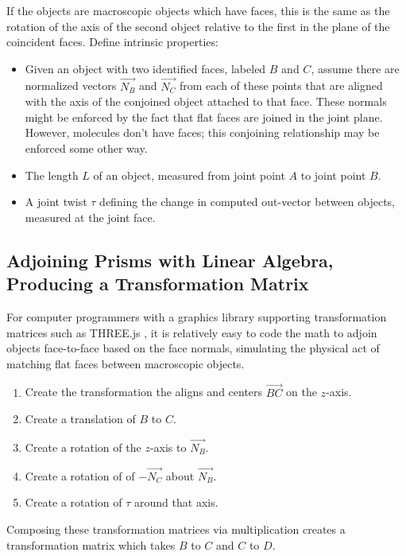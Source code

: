 \documentclass[mathematics,article,submit,pdftex,moreauthors]{Definitions/mdpi}
\begin{document}
If the objects are macroscopic objects which have faces, this is the same as the rotation
of the axis of the second object relative to the first in the plane of the coincident faces.
Define intrinsic properties:

\begin{itemize}
\item Given an object with two identified faces, labeled $B$ and $C$, assume there are normalized
  vectors $\overrightarrow{N_B}$ and $\overrightarrow{N_C}$
  from each of these points that are aligned with the axis of the conjoined object attached to
  that face. These normals might be enforced by the fact that flat faces are joined in the joint plane.
  However, molecules don't have faces; this conjoining relationship may be enforced some other way.
\item The length $L$ of an object, measured from joint point $A$ to joint point $B$.
\item A joint twist $\tau$ defining the change in computed out-vector between objects,
  measured at the joint face.
\end{itemize}

\subsection{Adjoining Prisms with Linear Algebra, Producing a Transformation Matrix}
\label{sec:adjoin}

For computer programmers with a graphics library supporting transformation matrices such
as THREE.js \cite{dirksen2013learning},
it is relatively easy to code the math to adjoin objects
face-to-face based on the face normals, simulating the physical act of
matching flat faces between macroscopic objects.
\begin{enumerate}
  \item Create the transformation the aligns and centers $\overrightarrow{BC}$ on the $z$-axis.
\item Create a translation of $B$ to $C$.
\item Create a rotation of the $z$-axis to  $\overrightarrow{N_B}$.
\item Create a rotation of of $-\overrightarrow{N_C}$ about $\overrightarrow{N_B}$.
  \item Create a rotation of $\tau$ around that axis.
\end{enumerate}
Composing these transformation matrices via multiplication creates a
transformation matrix which takes $B$ to $C$ and $C$ to $D$.
\end{document}
